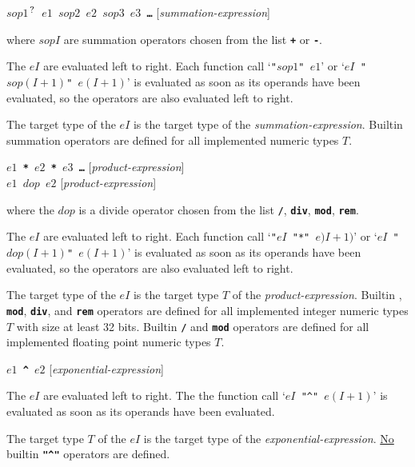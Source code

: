 \documentclass[12pt]{article}
\newcommand{\TT}[1]{{\tt \bfseries #1}}
\newcommand{\QMARK}{{$^{\,\mbox{\footnotesize ?}}$}}
\newenvironment{indpar}[1][0.3in]%
	{\begin{list}{}%
		     {\setlength{\itemsep}{0in}%
		      \setlength{\topsep}{0in}%
		      \setlength{\parsep}{1ex}%
		      \setlength{\labelwidth}{#1}%
		      \setlength{\leftmargin}{#1}%
		      \addtolength{\leftmargin}{\labelsep}}%
	 \item}%
	{\end{list}}
\begin{document}
\TT{$sop1$\QMARK{} $e1$ $sop2$ $e2$ $sop3$ $e3$ \ldots{}}
\hfill [{\em summation-expression}]
\begin{indpar}
where $sopI$ are summation operators chosen from the list
\TT{+} or \TT{-}.

The $eI$ are evaluated left to right.
Each function call
`{\tt "$sop1$" $e1$}' or
`{\tt $eI$ "$sop(I+1)$" $e(I+1)$}' is evaluated as soon as its operands have
been evaluated, so the operators are
also evaluated left to right.

The target type of the $eI$ is the target type of the
{\em summation-expression}.
Builtin summation operators are defined
for all implemented numeric types $T$.
\end{indpar}

\TT{$e1$ * $e2$ * $e3$ \ldots{}}
\hfill [{\em product-expression}] \\
\TT{$e1$ $dop$ $e2$}
\hfill [{\em product-expression}]
\begin{indpar}
where the $dop$ is a divide operator chosen from the list
\TT{/}, \TT{div}, \TT{mod}, \TT{rem}.

The $eI$ are evaluated left to right.
Each function call
`{\tt "$eI$ "*" $e)I+1)$}' or
`{\tt $eI$ "$dop(I+1)$" $e(I+1)$}' is evaluated as soon as its operands have
been evaluated, so the operators are
also evaluated left to right.

The target type of the $eI$ is the target type $T$ of the
{\em product-expression}.
Builtin \TT{*}, \TT{mod},
\TT{div}, and \TT{rem} operators are defined
for all implemented integer numeric types $T$ with size
at least 32 bits.
Builtin \TT{/} and \TT{mod} operators are defined
for all implemented floating point numeric types $T$.

\end{indpar}

\TT{$e1$ \textasciicircum{} $e2$}
\hfill [{\em exponential-expression}]
\begin{indpar}
The $eI$ are evaluated left to right.
The the function call
`{\tt $eI$ "\textasciicircum" $e(I+1)$}' is evaluated
as soon as its operands have
been evaluated.

The target type $T$ of the $eI$ is the target type of the
{\em exponential-expression}.  \underline{No} builtin
\TT{"\textasciicircum"} operators are defined.


\end{indpar}
\end{document}

